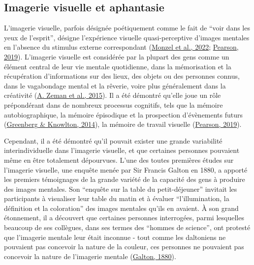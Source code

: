 \documentclass[
  12pt,
]{article}
\begin{document}
\hypertarget{imagerie-visuelle-et-aphantasie}{%
\subsection{Imagerie visuelle et
aphantasie}\label{imagerie-visuelle-et-aphantasie}}

L'imagerie visuelle, parfois désignée poétiquement comme le fait de
``voir dans les yeux de l'esprit'', désigne l'expérience visuelle
quasi-perceptive d'images mentales en l'absence du stimulus externe
correspondant
(\protect\hyperlink{ref-monzelAphantasiaDysikonesiaAnauralia2022}{Monzel
et al., 2022};
\protect\hyperlink{ref-pearsonHumanImaginationCognitive2019}{Pearson,
2019}). L'imagerie visuelle est considérée par la plupart des gens comme
un élément central de leur vie mentale quotidienne, dans la mémorisation
et la récupération d'informations sur des lieux, des objets ou des
personnes connus, dans le vagabondage mental et la rêverie, voire plus
généralement dans la créativité
(\protect\hyperlink{ref-zemanLivesImageryCongenital2015}{A. Zeman et
al., 2015}). Il a été démontré qu'elle joue un rôle prépondérant dans de
nombreux processus cognitifs, tels que la mémoire autobiographique, la
mémoire épisodique et la prospection d'évènements futurs
(\protect\hyperlink{ref-greenbergRoleVisualImagery2014}{Greenberg \&
Knowlton, 2014}), la mémoire de travail visuelle
(\protect\hyperlink{ref-pearsonHumanImaginationCognitive2019}{Pearson,
2019}).

Cependant, il a été démontré qu'il pouvait exister une grande
variabilité interindividuelle dans l'imagerie visuelle, et que certaines
personnes pouvaient même en être totalement dépourvues. L'une des toutes
premières études sur l'imagerie visuelle, une enquête menée par Sir
Francis Galton en 1880, a apporté les premiers témoignages de la grande
variété de la capacité des gens à produire des images mentales. Son
``enquête sur la table du petit-déjeuner'' invitait les participants à
visualiser leur table du matin et à évaluer ``l'illumination, la
définition et la coloration'' des images mentales qu'ils en avaient. À
son grand étonnement, il a découvert que certaines personnes
interrogées, parmi lesquelles beaucoup de ses collègues, dans ses termes
des ``hommes de science'', ont protesté que l'imagerie mentale leur
était inconnue - tout comme les daltoniens ne pouvaient pas concevoir la
nature de la couleur, ces personnes ne pouvaient pas concevoir la nature
de l'imagerie mentale
(\protect\hyperlink{ref-galtonSTATISTICSMENTALIMAGERY1880}{Galton,
1880}).
\end{document}
